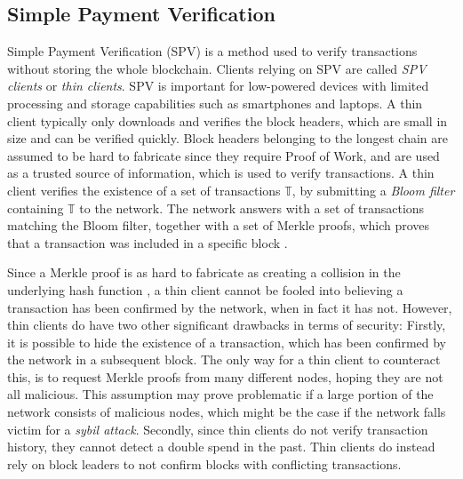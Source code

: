 \documentclass{style/kththesis}
\begin{document}
\subsection{Simple Payment Verification}
\label{spv-client}
Simple Payment Verification (SPV) is a method used to verify transactions without storing the whole blockchain. Clients relying on SPV are called \emph{SPV clients} or \emph{thin clients}. SPV is important for low-powered devices with limited processing and storage capabilities such as smartphones and laptops. 
A thin client typically only downloads and verifies the block headers, which are small in size and can be verified quickly. Block headers belonging to the longest chain are assumed to be hard to fabricate since they require Proof of Work, and are used as a trusted source of information, which is used to verify transactions. A thin client verifies the existence of a set of transactions $\mathbb{T}$, by submitting a \emph{Bloom filter} containing $\mathbb{T}$ to the network. The network answers with a set of transactions matching the Bloom filter, together with a set of Merkle proofs, which proves that a transaction was included in a specific block \cite{BIP0037, Antonopoulos14}. 

Since a Merkle proof is as hard to fabricate as creating a collision in the underlying hash function \cite{Coronado05}, a thin client cannot be fooled into believing a transaction has been confirmed by the network, when in fact it has not. However, thin clients do have two other significant drawbacks in terms of security: Firstly, it is possible to hide the existence of a transaction, which has been confirmed by the network in a subsequent block. The only way for a thin client to counteract this, is to request Merkle proofs from many different nodes, hoping they are not all malicious. This assumption may prove problematic if a large portion of the network consists of malicious nodes, which might be the case if the network falls victim for a \emph{sybil attack}. Secondly, since thin clients do not verify transaction history, they cannot detect a double spend in the past. Thin clients do instead rely on block leaders to not confirm blocks with conflicting transactions.
\end{document}
